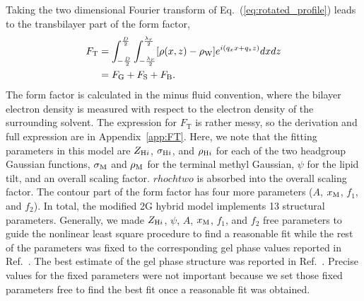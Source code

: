Taking the two dimensional Fourier transform of Eq.~(\ref{eq:rotated_profile})
leads to the transbilayer part of the form factor,
\begin{align}
  F_\mathrm{T} 
  &= \int_{-\frac{D}{2}}^{\frac{D}{2}} \int_{-\frac{\lambda_r}{2}}^{\frac{\lambda_r}{2}} 
     \mathopen{}\left[ \rho(x,z)-\rho_\mathrm{W} \right]\mathclose{} e^{i(q_xx+q_zz)} dxdz \\
  &= F_\mathrm{G} + F_\mathrm{S} + F_\mathrm{B}.
\end{align}
The form factor is calculated in the minus fluid convention, 
where the bilayer electron density
is measured with respect to the electron density of the surrounding solvent.
The expression for $F_\mathrm{T}$ is rather messy, so 
the derivation and full expression are in Appendix~\ref{app:FT}. Here, 
we note that
the fitting parameters in this model are $Z_{\mathrm{H}i}$, $\sigma_{\mathrm{H}i}$, and 
$\rho_{\mathrm{H}i}$ for each of the two headgroup Gaussian functions, $\sigma_\mathrm{M}$ and
$\rho_\mathrm{M}$ for
the terminal methyl Gaussian, $\psi$ for
the lipid tilt, and an overall scaling factor. $rhochtwo$ is absorbed into 
the overall scaling factor. The contour part of the 
form factor has four more parameters ($A$, $x_\textrm{M}$, $f_1$, and $f_2$).
In total, the modified 2G hybrid model implements 13 structural parameters.
Generally, we made $Z_{\mathrm{H}i}$, $\psi$, $A$, $x_\textrm{M}$, $f_1$, and $f_2$ free parameters
to guide the nonlinear least square procedure to find a reasonable fit
while the rest of the parameters was fixed to the corresponding gel phase values 
reported in Ref.~\cite{ref:Wiener89}. 
The best estimate of the gel phase structure was reported in
Ref.~\cite{Tristram-Nagle02}. Precise values for the fixed parameters
were not important because we set those fixed parameters free to find the best fit
once a reasonable fit was obtained.

\newpage
